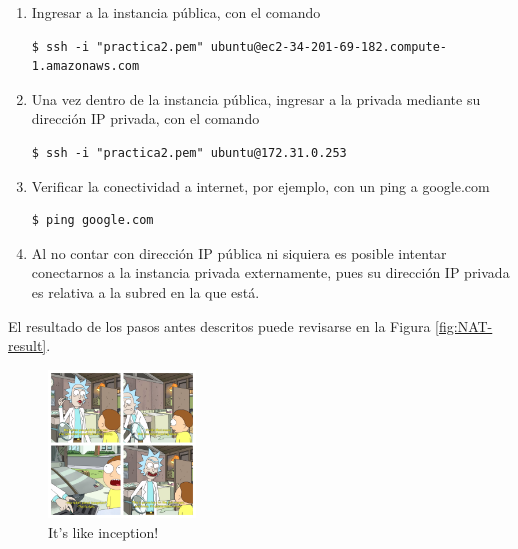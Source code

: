 \documentclass{article}
\begin{document}
\begin{enumerate}
  \item Ingresar a la instancia p\'ublica, con el
    comando
\begin{lstlisting}
$ ssh -i "practica2.pem" ubuntu@ec2-34-201-69-182.compute-1.amazonaws.com
\end{lstlisting}

  \item Una vez dentro de la instancia p\'ublica, ingresar
    a la privada mediante su direcci\'on IP privada, con
    el comando
\begin{lstlisting}
$ ssh -i "practica2.pem" ubuntu@172.31.0.253
\end{lstlisting}

  \item Verificar la conectividad a internet, por
    ejemplo, con un ping a google.com
\begin{lstlisting}
$ ping google.com
\end{lstlisting}

  \item Al no contar con direcci\'on IP p\'ublica
    ni siquiera es posible intentar conectarnos a
    la instancia privada externamente, pues su
    direcci\'on IP privada es relativa a la subred
    en la que est\'a.
\end{enumerate}

El resultado de los pasos antes descritos puede
revisarse en la Figura \ref{fig:NAT-result}.
\begin{figure}[H]
  \centering
  \includegraphics[width=0.35\textwidth]{SSNAT/inception}
  \caption{It's like inception!}
\end{figure}
\end{document}
